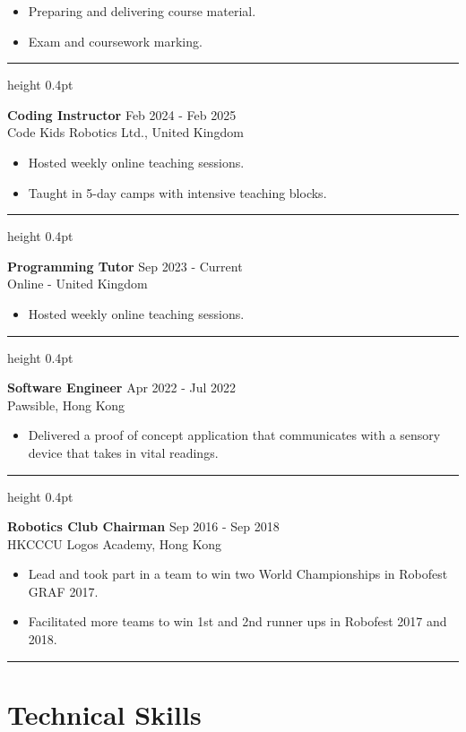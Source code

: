 \documentclass[11pt,a4paper]{article}
\newcommand{\sectionline}{
    \vspace{6pt}
    \hrule
    \vspace{10pt}
}
\newcommand{\subline}{
    \vspace{4pt}
    \hrule height 0.4pt
    \vspace{6pt}
}
\begin{document}
\begin{itemize}
    \item Preparing and delivering course material.
    \item Exam and coursework marking.
\end{itemize}

\subline

\textbf{Coding Instructor} \hfill Feb 2024 - Feb 2025 \\
Code Kids Robotics Ltd., United Kingdom

\begin{itemize}
    \item Hosted weekly online teaching sessions.
    \item Taught in 5-day camps with intensive teaching blocks.
\end{itemize}

\subline

\textbf{Programming Tutor} \hfill Sep 2023 - Current \\
Online - United Kingdom

\begin{itemize}
    \item Hosted weekly online teaching sessions.
\end{itemize}

\subline

\textbf{Software Engineer} \hfill Apr 2022 - Jul 2022 \\
Pawsible, Hong Kong

\begin{itemize}
    \item Delivered a proof of concept application that communicates with a sensory device that takes in vital readings.
\end{itemize}

\subline

\textbf{Robotics Club Chairman} \hfill Sep 2016 - Sep 2018 \\
HKCCCU Logos Academy, Hong Kong

\begin{itemize}
    \item Lead and took part in a team to win two World Championships in Robofest GRAF 2017.
    \item Facilitated more teams to win 1st and 2nd runner ups in Robofest 2017 and 2018.
\end{itemize}

\sectionline
\section*{Technical Skills}
\end{document}
